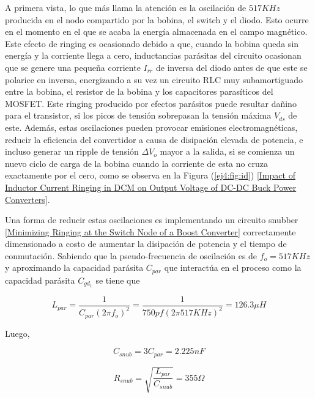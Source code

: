 A primera vista, lo que más llama la atención es la oscilación de $517KHz$ producida en el nodo compartido por la bobina, el switch y el diodo. Esto ocurre en el momento en el que se acaba la energía almacenada en el campo magnético. Este efecto de ringing es ocasionado debido a que, cuando la bobina queda sin energía y la corriente llega a cero, inductancias parásitas del circuito ocasionan que se genere una pequeña corriente $I_{rr}$ de inversa del diodo antes de que este se polarice en inversa, energizando a su vez un circuito RLC muy subamortiguado entre la bobina, el resistor de la bobina y los capacitores parasíticos del MOSFET. Este ringing producido por efectos parásitos puede resultar dañino para el transistor, si los picos de tensión sobrepasan la tensión máxima $V_{ds}$ de este. Además, estas oscilaciones pueden provocar emisiones electromagnéticas, reducir la eficiencia del convertidor a causa de disipación elevada de potencia, e incluso generar un ripple de tensión $\Delta V_o$ mayor a la salida, si se comienza un nuevo ciclo de carga de la bobina cuando la corriente de esta no cruza exactamente por el cero, como se observa en la Figura (\ref{ej4:fig:id}) [\href{https://www.researchgate.net/publication/317525001_Impact_of_inductor_current_ringing_in_DCM_on_output_voltage_of_DC-DC_buck_power_converters}{Impact of Inductor Current Ringing in DCM on Output Voltage of DC-DC Buck Power Converters}].

Una forma de reducir estas oscilaciones es implementando un circuito snubber [\href{https://www.ti.com/lit/an/slva255/slva255.pdf}{Minimizing Ringing at the Switch Node of a Boost Converter}] correctamente dimensionado a costo de aumentar la disipación de potencia y el tiempo de conmutación. Sabiendo que la pseudo-frecuencia de oscilación es de $f_{o} = 517KHz$ y aproximando la capacidad parásita $C_{par}$ que interactúa en el proceso como la capacidad parásita $C_{gd_1}$ se tiene que

\begin{equation}
	L_{par} = \frac{1}{C_{par}\left( 2\pi f_{o} \right)^2} = \frac{1}{750pf\left( 2\pi 517KHz \right)^2} = 126.3\mu H 
\end{equation}

Luego,

\begin{equation}
	C_{snub} = 3C_{par} = 2.225nF
\end{equation}

\begin{equation}
	R_{snub} = \sqrt{\frac{L_{par}}{C_{snub}}} = 355\Omega
\end{equation}

